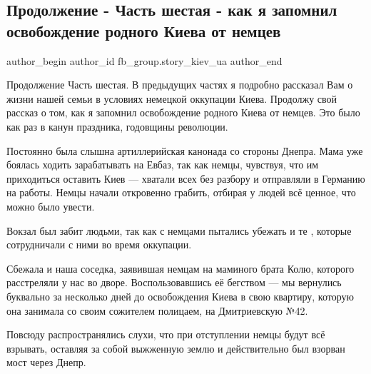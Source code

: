  
 
 
 
 
 
\subsection{Продолжение - Часть шестая - как я запомнил освобождение родного Киева от немцев}
\label{sec:09_07_2021.fb.fb_group.story_kiev_ua.1.osvobozhdenie_kieva}
 
\ifcmt
 author_begin
   author_id fb_group.story_kiev_ua
 author_end
\fi

Продолжение Часть шестая. В предыдущих частях я подробно рассказал Вам о жизни
нашей семьи в условиях немецкой оккупации Киева. Продолжу свой рассказ о том,
как я запомнил освобождение родного Киева от немцев. Это было как раз в канун
праздника, годовщины революции. 

Постоянно была слышна артиллерийская  канонада со стороны Днепра. Мама уже
боялась ходить зарабатывать на Евбаз, так как немцы, чувствуя, что им
приходиться оставить Киев — хватали всех без разбору и отправляли в Германию на
работы. Немцы начали откровенно грабить, отбирая у людей  всё ценное, что можно
было увести. 

Вокзал был забит людьми, так как с немцами пытались убежать и те , которые
сотрудничали с  ними  во время оккупации.  

Сбежала и наша соседка, заявившая немцам на  маминого брата Колю, которого
расстреляли у нас во дворе.  Воспользовавшись её бегством — мы вернулись
буквально за несколько дней до освобождения Киева в свою квартиру, которую она
занимала со своим сожителем полицаем, на Дмитриевскую №42.

Повсюду распространялись слухи, что при отступлении немцы будут всё взрывать,
оставляя за собой выжженную землю и действительно был взорван мост через Днепр.

